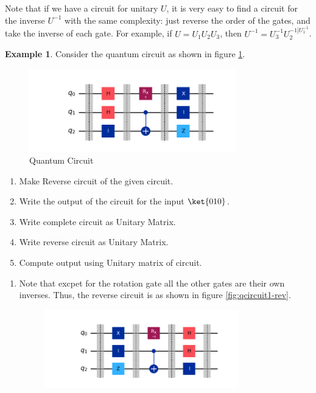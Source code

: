 \documentclass[12pt, oneside]{book}
\theoremstyle{definition}
\theoremstyle{definition}
\newtheorem{example}{Example}[section]
\theoremstyle{remark}
\begin{document}
Note that if we have a circuit for unitary $U$, it is very easy to find a circuit for the inverse $U^{-1}$ with the same complexity: just reverse the order of the gates, and take the inverse of each gate. For example, if $U=U_1U_2U_3$, then $U^{-1}=U_3^{-1} U_2^{-1]U_1^{-1}}$.
\begin{example}
    Consider the quantum circuit as shown in figure \ref{fig:qcircuit1}.
    \begin{figure}[H]
        \centering
        \includegraphics[width=0.8\textwidth]{../images/qcircuit1.png}
        \caption{Quantum Circuit}
        \label{fig:qcircuit1}
    \end{figure}
    \begin{enumerate}
        \item Make Reverse circuit of the given circuit.
        \item Write the output of the circuit for the input $\ket{010}$.
        \item Write complete circuit as Unitary Matrix.
        \item Write reverse circuit as Unitary Matrix.
        \item Compute output using Unitary matrix of circuit.
    \end{enumerate}
    \begin{enumerate}
        \item Note that excpet for the rotation gate all the other gates are their own inverses. Thus, the reverse circuit is as shown in figure \ref{fig:qcircuit1-rev}.
        \begin{figure}[H]
            \centering
            \includegraphics[width=0.8\textwidth]{../images/qcircuit1-rev.png}

\end{figure}
\end{enumerate}
\end{example}
\end{document}
